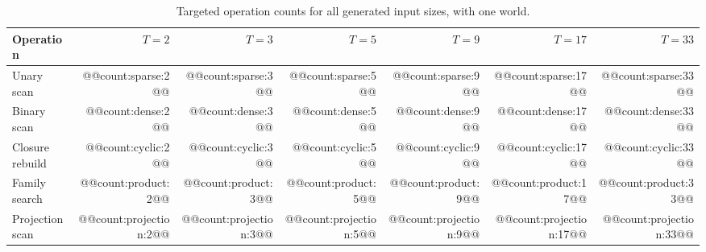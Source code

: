 \begin{table}[htbp]
\caption{Targeted operation counts for all generated input sizes, with one world.}\label{tab:counts}
\small
\begin{tabularx}{\textwidth}{@{}Yrrrrrr@{}}
\toprule Operation & $T=2$ & $T=3$ & $T=5$ & $T=9$ & $T=17$ & $T=33$ \\\midrule
Unary scan & @@count:sparse:2@@ & @@count:sparse:3@@ & @@count:sparse:5@@ & @@count:sparse:9@@ & @@count:sparse:17@@ & @@count:sparse:33@@ \\
Binary scan & @@count:dense:2@@ & @@count:dense:3@@ & @@count:dense:5@@ & @@count:dense:9@@ & @@count:dense:17@@ & @@count:dense:33@@ \\
Closure rebuild & @@count:cyclic:2@@ & @@count:cyclic:3@@ & @@count:cyclic:5@@ & @@count:cyclic:9@@ & @@count:cyclic:17@@ & @@count:cyclic:33@@ \\
Family search & @@count:product:2@@ & @@count:product:3@@ & @@count:product:5@@ & @@count:product:9@@ & @@count:product:17@@ & @@count:product:33@@ \\
Projection scan & @@count:projection:2@@ & @@count:projection:3@@ & @@count:projection:5@@ & @@count:projection:9@@ & @@count:projection:17@@ & @@count:projection:33@@ \\
\bottomrule
\end{tabularx}
\end{table}
